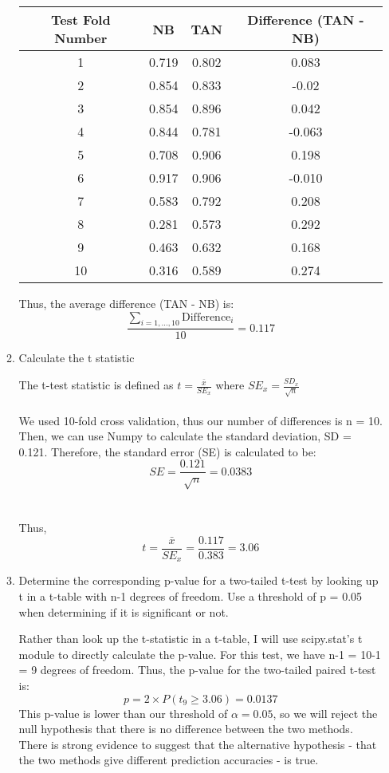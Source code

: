 \documentclass{article}
\newenvironment{soln}{
	\leavevmode\color{blue}\ignorespaces
}{}
\begin{document}
\begin{enumerate}
\begin{enumerate}
\begin{soln}
\begin{center}
\begin{tabular}{ |c|c|c|c| } 
 \hline
 Test Fold Number & NB & TAN & Difference (TAN - NB) \\ 
\hline
 1 & 0.719 & 0.802 & 0.083 \\ 
 2 & 0.854 & 0.833 & -0.02 \\ 
 3 & 0.854 & 0.896 & 0.042 \\
 4 & 0.844 & 0.781 & -0.063 \\
 5 & 0.708 & 0.906 & 0.198 \\
 6 & 0.917 & 0.906 & -0.010 \\
 7 & 0.583 & 0.792 & 0.208 \\
 8 & 0.281 & 0.573 & 0.292 \\
 9 & 0.463 & 0.632 & 0.168 \\
 10 & 0.316 & 0.589 & 0.274 \\
 \hline
\end{tabular}
\end{center}

Thus, the average difference (TAN - NB) is:
\[\frac{\sum_{i = 1, ... , 10}{\textrm{Difference}_i}}{10} = 0.117\]

\end{soln}
\item Calculate the t statistic \\
\begin{soln}
The t-test statistic is defined as $t = \frac{\bar{x}}{SE_x}$ where $SE_x = \frac{SD_x}{\sqrt{n}}$ \\ \\
We used 10-fold cross validation, thus our number of differences is n = 10. Then, we can use Numpy to calculate the standard deviation, SD = 0.121. Therefore, the standard error (SE) is calculated to be:
\[ SE = \frac{0.121}{\sqrt{n}} = 0.0383 \] \\ \\
Thus, 
\[t = \frac{\bar{x}}{SE_x} = \frac{0.117}{0.383} = 3.06\]

\end{soln}
\item Determine the corresponding p-value for a two-tailed t-test by looking up t in a t-table with n-1 degrees of freedom. Use a threshold of p = 0.05 when determining if it is significant or not.
\begin{soln}
Rather than look up the t-statistic in a t-table, I will use scipy.stat's t module to directly calculate the p-value. For this test, we have n-1 = 10-1 = 9 degrees of freedom. Thus, the p-value for the two-tailed paired t-test is:
\[p = 2\times P(t_9\geq 3.06) = 0.0137 \]
This p-value is lower than our threshold of $\alpha = 0.05$, so we will reject the null hypothesis that there is no difference between the two methods. There is strong evidence to suggest that the alternative hypothesis - that the two methods give different prediction accuracies - is true.
\end{soln}

\end{enumerate}
\end{enumerate}
\end{document}
